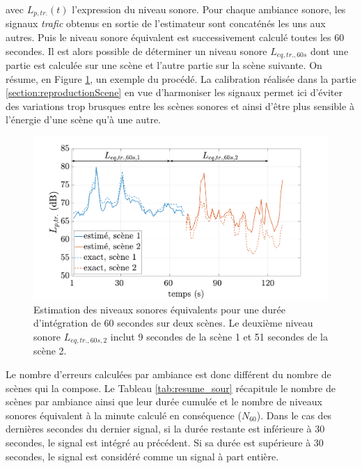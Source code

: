 avec $L_{p,tr.}(t)$ l'expression du niveau sonore.
Pour chaque ambiance sonore, les signaux \textit{trafic} obtenus en sortie de l'estimateur sont concaténés les uns aux autres. Puis le niveau sonore équivalent est successivement calculé toutes les 60 secondes. Il est alors possible de déterminer un niveau sonore $L_{eq,tr.,60s}$ dont une partie est calculée sur une scène et l'autre partie sur la scène suivante. On résume, en Figure \ref{fig:exempe_mae60}, un exemple du procédé. La calibration réalisée dans la partie \ref{section:reproductionScene} en vue d'harmoniser les signaux permet ici d'éviter des variations trop brusques entre les scènes sonores et ainsi d'être plus sensible à l'énergie d'une scène qu'à une autre.

\begin{figure}[h!]
\centering
\includegraphics[width=.9\linewidth]{./figures/resultats/Lp_mae.pdf}
\caption{Estimation des niveaux sonores équivalents pour une durée d'intégration de 60 secondes sur deux scènes. Le deuxième niveau sonore $L_{eq,tr.,60s,2}$ inclut 9 secondes de la scène 1 et 51 secondes de la scène 2.}
\label{fig:exempe_mae60}
\end{figure}

Le nombre d'erreurs calculées par ambiance est donc différent du nombre de scènes qui la compose. Le Tableau \ref{tab:resume_sour} récapitule le nombre de scènes par ambiance ainsi que leur durée cumulée et le nombre de niveaux sonores équivalent à la minute calculé en conséquence ($N_{60}$). Dans le cas des dernières secondes du dernier signal, si la durée restante est inférieure à 30 secondes, le signal est intégré au précédent. Si sa durée est supérieure à 30 secondes, le signal est considéré comme un signal à part entière.

